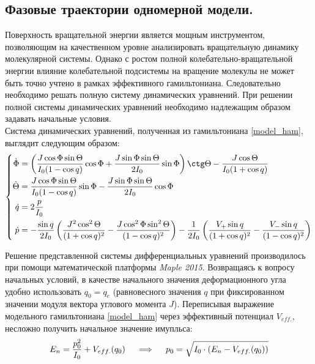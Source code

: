 \subsection{Фазовые траектории одномерной модели.}

Поверхность вращательной энергии является мощным инструментом, позволяющим на качественном уровне анализировать вращательную динамику молекулярной системы. Однако с ростом полной колебательно-вращательной энергии влияние колебательной подсистемы на вращение молекулы не может быть точно учтено в рамках эффективного гамильтониана. Следовательно необходимо решать полную систему динамических уравнений. При решении полной системы динамических уравнений необходимо надлежащим образом задавать начальные условия. \\

Система динамических уравнений, полученная из гамильтониана \eqref{model_ham}, выглядит следующим образом:
\vverh
\begin{gather}
\left\{
\begin{aligned}
\dot{\Phi} &= \left( \frac{J \cos \Phi \sin \Theta}{I_0 ( 1 - \cos q)} \cos \Phi + \frac{J \sin \Phi \sin \Theta}{2I_0} \sin \Phi \right) \ctg \Theta - \frac{J \cos \Theta}{I_0 (1 + \cos q)} \\
\dot{\Theta} &= \frac{J \cos \Phi \sin \Theta}{I_0 (1 - \cos q)} \sin \Phi - \frac{J \sin \Phi \sin \Theta}{2I_0} \cos \Phi \\
\dot{q} &= 2	\frac{p}{I_0} \\
\dot{p} &= - \frac{\sin q}{2I_0} \left( \frac{J^2 \cos^2 \Theta}{(1 + \cos q)^2} - \frac{J \cos^2 \Phi \sin^2 \Theta}{(1 - \cos q)^2} \right) - \frac{1}{2I_0} \left( \frac{V_{+} \sin q}{(1 + \cos q)^2} - \frac{V_{-} \sin q}{(1 - \cos q)^2} \right)
\end{aligned}
\right. \notag
\end{gather}

Решение представленной системы дифференциальных уравнений производилось при помощи математической платформы \textit{Maple 2015}. Возвращаясь к вопросу начальных условий, в качестве начального значения деформационного угла удобно использовать $q_0 = q_e$ (равновесного значения $q$ при фиксированном значении модуля вектора углового момента $J$). Переписывая выражение модельного гамильтониана \eqref{model_ham} через эффективный потенциал $V_{eff.}$, несложно получить начальное значение имупльса:
\vverh
\begin{gather}
E_n = \frac{p_0^2}{I_0} + V_{eff.} (q_0) \quad \implies \quad p_0 = \sqrt{I_0 \cdot \left( E_n - V_{eff.} (q_0) \right) } \notag
\end{gather}


